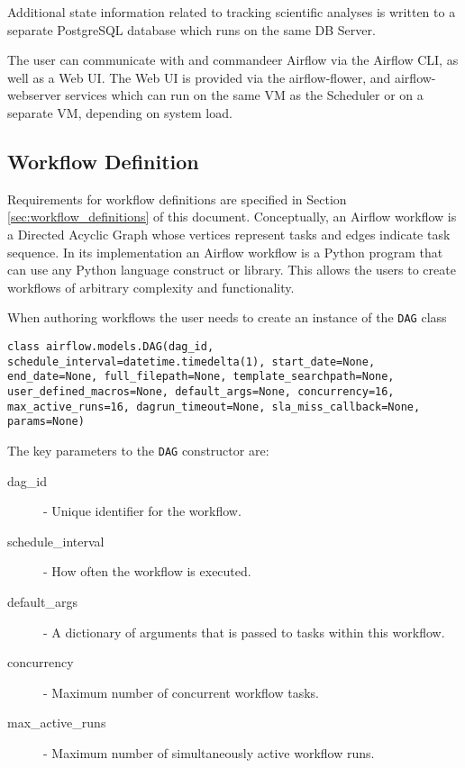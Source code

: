 Additional state information related to tracking scientific analyses is written to a separate PostgreSQL database which runs on the same DB Server.

The user can communicate with and commandeer Airflow via the Airflow CLI, as well as a Web UI. The Web UI is provided via the airflow-flower, and airflow-webserver services which can run on the same VM as the Scheduler or on a separate VM, depending on system load.
 
\subsection{Workflow Definition}

Requirements for workflow definitions are specified in Section \ref{sec:workflow_definitions} of this document. Conceptually, an Airflow workflow is a Directed Acyclic Graph whose vertices represent tasks and edges indicate task sequence. In its implementation an Airflow workflow is a Python program that can use any Python language construct or library. This allows the users to create workflows of arbitrary complexity and functionality.

When authoring workflows the user needs to create an instance of the \texttt{DAG} class

\begin{verbatim}
class airflow.models.DAG(dag_id, schedule_interval=datetime.timedelta(1), start_date=None, end_date=None, full_filepath=None, template_searchpath=None, user_defined_macros=None, default_args=None, concurrency=16, max_active_runs=16, dagrun_timeout=None, sla_miss_callback=None, params=None)
\end{verbatim}

The key parameters to the \texttt{DAG} constructor are:

\begin{description}
\item [dag\_id] - Unique identifier for the workflow.
\item [schedule\_interval] - How often the workflow is executed.
\item [default\_args] - A dictionary of arguments that is passed to tasks within this workflow.
\item [concurrency] - Maximum number of concurrent workflow tasks.
\item [max\_active\_runs] - Maximum number of simultaneously active workflow runs.
\end{description}


